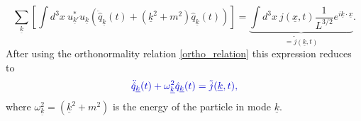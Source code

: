 \documentclass[12pt, titlepage]{article}
\begin{document}
\begin{equation}
 \sum_{\underline{k}}
 \left[ 
 \int d^{3}x \ u^{\ast}_{\underline{k}'}u_{\underline{k}}
 \left( 
 \ddot{\hat{q}}_{\underline{k}}(t) 
 +
 \left( \underline{k}^{2}+m^{2}\right) 
 \hat{q}_{\underline{k}}(t) 
 \right) 
  \right] 
  ={\underbrace{\int d^{3}x \ 
j(\underline{x},t) \dfrac{1}{L^{3/2}} e^{i\underline{k}\cdot\underline{x}}}_{=\tilde{j}(\underline{k},t)}}
  .
\end{equation}
After using the orthonormality relation \eqref{ortho_relation} this expression reduces to
\begin{equation}\label{eq_for_q}
 \textcolor[RGB]{0,0,204}{
\ddot{\hat{q}}_{\underline{k}}(t) 
 +
\omega_{\underline{k}}^{2}
 \hat{q}_{\underline{k}}(t) 
  =\tilde{j}(\underline{k},t)
  ,}
\end{equation}
where  $ \omega_{\underline{k}}^{2} = (\underline{k}^{2}+m^{2})  $ is the energy of the particle in mode $ \underline{k} $.
\end{document}
